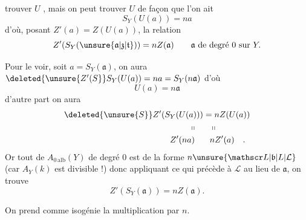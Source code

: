 trouver $U$ , mais on peut trouver $U$ de
façon que l'on ait
\[
S_Y(U(a))=na
\]
d'où, posant $Z'(a)=Z(U(a))$, la relation
\[
Z'(S_Y(\unsure{\mathfrak{a}|\mathfrak{z}|\mathfrak{t}}))=nZ(\mathfrak{a})\qquad \mathfrak{a}\ \text{de degré 0 sur }Y.
\]

Pour le voir, soit $a=S_Y(\mathfrak{a})$, on aura
$\deleted{\unsure{Z'(S}}S_Y(U(a))=na=S_Y(n\mathfrak{a})$ d'où 
\[
U(a)=n\mathfrak{a}
\]
d'autre part on aura
\[
\begin{aligned}
\deleted{\unsure{S}}Z'(S_Y(U(a)))&=nZ(U(a))\\
\shortparallel\quad &\phantom{=}\shortparallel\\
Z'(na)\quad &\phantom{=}nZ'(a)\quad .
\end{aligned}
\]
Or tout  de $A_{0\,\mathrm{alb}}(Y)$ de degré 0 est
de la forme $n\unsure{\mathscr L|\mathfrak b|L|\mathcal L}$ (car $A_Y(k)$ est divisible !)
donc appliquant ce qui précède à $\mathscr L$ au lieu de $\mathfrak{a}$,
on trouve
\[
Z'(S_Y(\mathfrak{a}))=nZ(\mathfrak{a}).
\]

On prend comme isogénie la multiplication par $n$.
